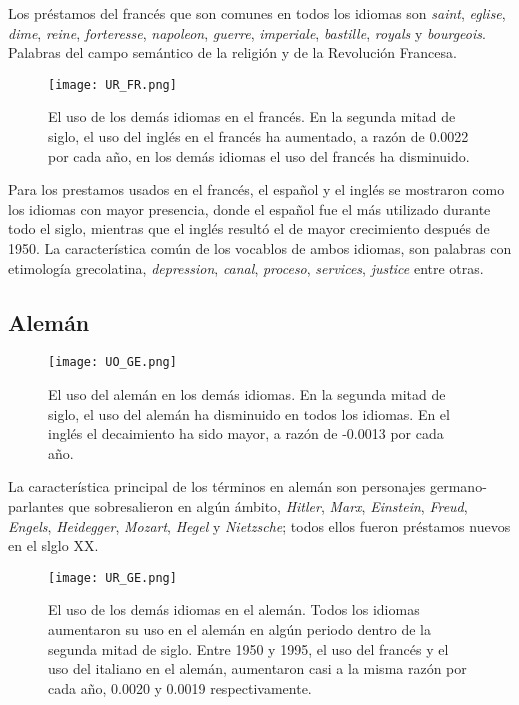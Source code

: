 Los préstamos del francés que son comunes en todos los idiomas son   \textit{saint}, \textit{eglise}, \textit{dime}, \textit{reine}, \textit{forteresse}, \textit{napoleon}, \textit{guerre}, \textit{imperiale}, \textit{bastille}, \textit{royals} y \textit{bourgeois}. Palabras  del campo semántico de la religión y de la Revolución Francesa.


\begin{figure}[h!]
	\centering
	\texttt{[image: UR\_FR.png]}
	\caption{El uso de los demás idiomas en el francés. En la segunda mitad de siglo, el uso del inglés en el francés ha aumentado, a razón de 0.0022 por cada año, en los demás idiomas el uso del francés ha disminuido. }
	\label{fig.UR_FR}
\end{figure}
		
		

		
Para los prestamos usados en el francés, el español y el inglés se mostraron como los idiomas con mayor presencia, donde el español fue el más utilizado durante todo el siglo, mientras que el inglés resultó el de mayor crecimiento después de 1950. La característica común de los vocablos de ambos idiomas, son palabras con etimología grecolatina,  \textit{depression}, \textit{canal}, \textit{proceso}, \textit{services}, \textit{justice} entre otras. 



\subsection{Alemán} %

\begin{figure}[h!]
	\centering
	\texttt{[image: UO\_GE.png]}
	\caption{El uso del alemán en los demás idiomas. En la segunda mitad de siglo, el uso del alemán ha disminuido en todos los idiomas. En el inglés el decaimiento ha sido mayor, a razón de  -0.0013 por cada año.}
	\label{fig.UO_GE}

\end{figure}

La característica principal de los términos en alemán son personajes germano-parlantes que sobresalieron en algún ámbito, \textit{Hitler}, \textit{Marx}, \textit{Einstein}, \textit{Freud}, \textit{Engels}, \textit{Heidegger}, \textit{Mozart}, \textit{Hegel} y \textit{Nietzsche}; todos ellos fueron préstamos nuevos en el slglo XX. 


\begin{figure}[h!]
	\centering
	\texttt{[image: UR\_GE.png]}
	\caption{El uso de los demás idiomas en el alemán. Todos los idiomas aumentaron su uso en el alemán en algún periodo dentro de la segunda mitad de siglo. Entre 1950 y 1995, el uso del francés y el uso del italiano en el alemán, aumentaron casi a la misma razón por cada año, 0.0020 y 0.0019 respectivamente.}
	\label{fig.UR_GE}
\end{figure}

